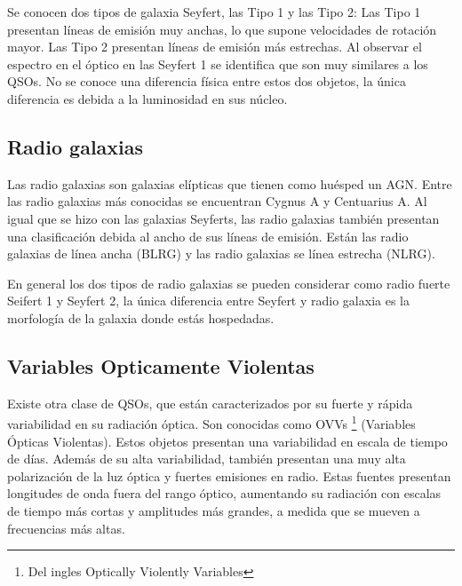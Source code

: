 Se conocen dos tipos de galaxia Seyfert, las Tipo 1 y las Tipo 2: Las Tipo 1 presentan líneas de emisión muy anchas, lo que supone velocidades de rotación mayor. Las Tipo 2 presentan líneas de emisión más estrechas. Al observar el espectro en el óptico en las Seyfert 1 se identifica que son muy similares a los QSOs. No se conoce una diferencia física entre estos dos objetos, la única diferencia es debida a la luminosidad en sus núcleo. 


	\subsection{Radio galaxias}
	\label{subsec:Radio_Galaxy}

Las radio galaxias son galaxias elípticas que tienen como huésped un AGN. Entre las radio galaxias más conocidas se encuentran Cygnus A y Centuarius A. Al igual que se hizo con las galaxias Seyferts, las radio galaxias también presentan una clasificación debida al ancho de sus  líneas de emisión. Están las radio galaxias de línea ancha (BLRG) y las radio galaxias se línea estrecha (NLRG).

En general los dos tipos de radio galaxias se pueden considerar como radio fuerte Seifert 1 y Seyfert 2, la única diferencia entre Seyfert y radio galaxia es la morfología de la galaxia donde estás hospedadas. 

	\subsection{Variables Opticamente Violentas}
	\label{subsec:Optically_Violently_Variables}

Existe otra clase de QSOs, que están caracterizados por su fuerte y rápida variabilidad en su radiación óptica. Son conocidas como OVVs \footnote{Del ingles Optically Violently Variables } (Variables Ópticas Violentas). Estos objetos presentan una variabilidad en escala de tiempo de días. Además de su alta variabilidad, también presentan una muy alta polarización de la luz óptica y fuertes emisiones en radio. Estas fuentes presentan longitudes de onda fuera del rango óptico, aumentando su radiación con escalas de tiempo más cortas y amplitudes más grandes, a medida que se mueven a frecuencias más altas.  

